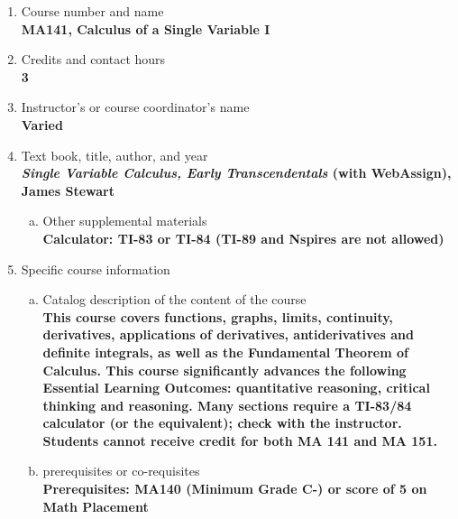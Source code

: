 \label{MA141}  %
\begin{enumerate}[1.]
\item Course number and name\\
  {\bfseries
    MA141, Calculus of a Single Variable I    
  }
  
\item Credits and contact hours\\
  {\bfseries
    3  %
  }

\item Instructor's or course coordinator's name\\
  {\bfseries
    Varied    
  }

\item Text book, title, author, and year\\
  {\bfseries
    {\em Single Variable Calculus, Early Transcendentals} (with WebAssign), James Stewart
  }
\begin{enumerate}[a.]
\item Other supplemental materials\\
  {\bfseries
    Calculator: TI-83 or TI-84 (TI-89 and Nspires are not allowed)
  }
\end{enumerate}

\item Specific course information
\begin{enumerate}[a.]  
\item Catalog description of the content of the course\\
  {\bfseries
This course covers functions, graphs, limits, continuity, derivatives, applications of derivatives, antiderivatives and definite integrals, as well as the Fundamental Theorem of Calculus. This course significantly advances the following Essential Learning Outcomes: quantitative reasoning, critical thinking and reasoning. Many sections require a TI-83/84 calculator (or the equivalent); check with the instructor. Students cannot receive credit for both MA 141 and MA 151.    
  }

\item prerequisites or co-requisites\\
  {\bfseries
    Prerequisites: MA140 (Minimum Grade C-) or score of 5 on Math Placement  %
  }


\end{enumerate}
\end{enumerate}
